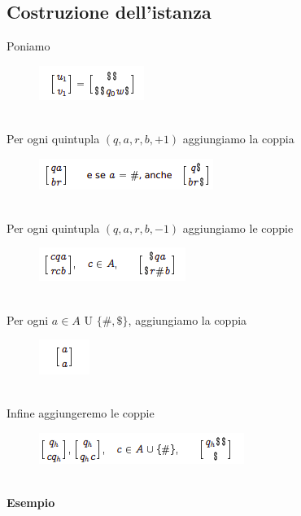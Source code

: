\subsection{Costruzione dell'istanza}
Poniamo 
\begin{figure}[htp]
    \centering
    \includegraphics[scale=0.9]{tesi_stile/img/cap7f4.png}
\end{figure}\\
Per ogni quintupla $(q,a,r,b, +1)$ aggiungiamo la coppia\\
\begin{figure}[htp]
    \centering
    \includegraphics[scale=0.9]{tesi_stile/img/cap7f5.png}
\end{figure}\\
Per ogni quintupla $(q,a,r,b, -1)$ aggiungiamo le coppie\\
\begin{figure}[htp]
    \centering
    \includegraphics[scale=0.9]{tesi_stile/img/cap7f6.png}
\end{figure}\\
\newpage
Per ogni $a \in A$ U $\{\#,\$\}$, aggiungiamo la coppia\\
\begin{figure}[htp]
    \centering
    \includegraphics[scale=0.9]{tesi_stile/img/cap7f8.png}
\end{figure}\\
Infine aggiungeremo le coppie\\
\begin{figure}[htp]
    \centering
    \includegraphics[scale=0.9]{tesi_stile/img/cap7f9.png}
\end{figure}\\
\textbf{Esempio}\\
